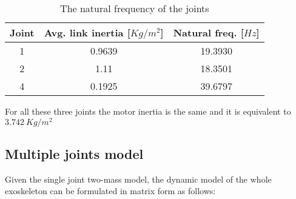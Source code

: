 \begin{table}[!t]
	\renewcommand{\arraystretch}{1.3}
	\caption{The natural frequency of the joints}
	\label{tab:naturalFrequencies}
	\centering
	\begin{tabular}{c c c}
		\hline \hline
		\bfseries Joint & \bfseries Avg. link inertia [$Kg/m^2$] & \bfseries Natural freq. [$Hz$]\\
		\hline
		1 & 0.9639 & 19.3930\\
		2 & 1.11 & 18.3501\\
		4 & 0.1925 & 39.6797\\
		\hline \hline
	\end{tabular}
\end{table}
For all these three joints the motor inertia is the same and it is equivalent to $3.742 \ Kg/m^2$


\subsection{Multiple joints model} \label{Full dynamics model}

Given the single joint two-mass model, the dynamic model of the whole exoskeleton can be formulated in matrix form as follows:
\setlength{\arraycolsep}{0.0em}



